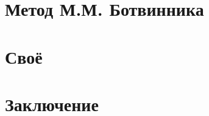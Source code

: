 \documentclass{beamer}
\begin{document}
\section{Метод М.М. Ботвинника}


\section{Своё}




\section{Заключение}

\end{document}
